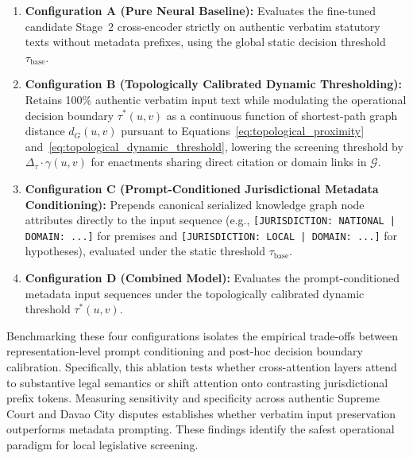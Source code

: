         \begin{enumerate}
            \item \textbf{Configuration A (Pure Neural Baseline):} Evaluates the fine-tuned candidate Stage~2 cross-encoder strictly on authentic verbatim statutory texts without metadata prefixes, using the global static decision threshold $\tau_{\text{base}}$.
            \item \textbf{Configuration B (Topologically Calibrated Dynamic Thresholding):} Retains 100\% authentic verbatim input text while modulating the operational decision boundary $\tau^*(u, v)$ as a continuous function of shortest-path graph distance $d_G(u, v)$ pursuant to Equations~\ref{eq:topological_proximity} and~\ref{eq:topological_dynamic_threshold}, lowering the screening threshold by $\Delta_{\tau} \cdot \gamma(u, v)$ for enactments sharing direct citation or domain links in $\mathcal{G}$.
            \item \textbf{Configuration C (Prompt-Conditioned Jurisdictional Metadata Conditioning):} Prepends canonical serialized knowledge graph node attributes directly to the input sequence (e.g., \texttt{[JURISDICTION: NATIONAL | DOMAIN: ...]} for premises and \texttt{[JURISDICTION: LOCAL | DOMAIN: ...]} for hypotheses), evaluated under the static threshold $\tau_{\text{base}}$.
            \item \textbf{Configuration D (Combined Model):} Evaluates the prompt-conditioned metadata input sequences under the topologically calibrated dynamic threshold $\tau^*(u, v)$.
        \end{enumerate}

        Benchmarking these four configurations isolates the empirical trade-offs between representation-level prompt conditioning and post-hoc decision boundary calibration. Specifically, this ablation tests whether cross-attention layers attend to substantive legal semantics or shift attention onto contrasting jurisdictional prefix tokens. Measuring sensitivity and specificity across authentic Supreme Court and Davao City disputes establishes whether verbatim input preservation outperforms metadata prompting. These findings identify the safest operational paradigm for local legislative screening.

